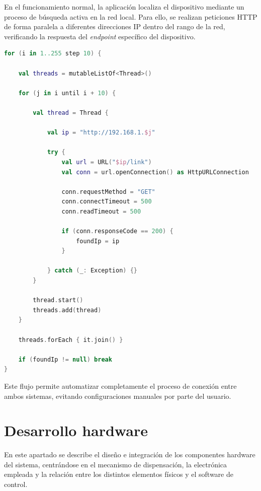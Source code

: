 En el funcionamiento normal, la aplicación localiza el dispositivo mediante un proceso de búsqueda activa en la red local. Para ello, se realizan peticiones HTTP de forma paralela a diferentes direcciones IP dentro del rango de la red, verificando la respuesta del \textit{endpoint} específico del dispositivo.

\begin{code}[H]
\begin{lstlisting}[language=Kotlin]
for (i in 1..255 step 10) {

    val threads = mutableListOf<Thread>()

    for (j in i until i + 10) {

        val thread = Thread {

            val ip = "http://192.168.1.$j"

            try {
                val url = URL("$ip/link")
                val conn = url.openConnection() as HttpURLConnection

                conn.requestMethod = "GET"
                conn.connectTimeout = 500
                conn.readTimeout = 500

                if (conn.responseCode == 200) {
                    foundIp = ip
                }

            } catch (_: Exception) {}
        }

        thread.start()
        threads.add(thread)
    }

    threads.forEach { it.join() }

    if (foundIp != null) break
}
\end{lstlisting}
\caption{Búsqueda paralela del dispositivo mediante peticiones HTTP}
\label{cod:discover}
\end{code}

Este flujo permite automatizar completamente el proceso de conexión entre ambos sistemas, evitando configuraciones manuales por parte del usuario.

\section{Desarrollo hardware}
\label{sec:desarrollo_hardware}

En este apartado se describe el diseño e integración de los componentes hardware del sistema, centrándose en el mecanismo de dispensación, la electrónica empleada y la relación entre los distintos elementos físicos y el software de control.

